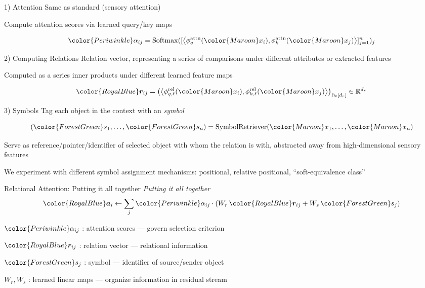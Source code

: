 \documentclass[xcolor={dvipsnames}]{beamer}
\newcommand{\senscolor}[1]{{\color{Maroon} #1 }}
\newcommand{\relcolor}[1]{{\color{RoyalBlue} #1 }}
\newcommand{\attncolor}[1]{{\color{Periwinkle} #1 }}
\newcommand{\symbcolor}[1]{{\color{ForestGreen} #1}}
\begin{document}
\begin{frame}{1) Attention}
    Same as standard (sensory attention)

    Compute attention scores via learned query/key maps

    \[\attncolor{\alpha_{ij}} = \mathrm{Softmax}([\iprod{\phiqattn(\senscolor{x_i})}{\phikattn(\senscolor{x_j})}]_{j=1}^{n})_j\]
\end{frame}

\begin{frame}{2) Computing Relations}
    \alert{Relation vector}, representing a series of comparisons under different attributes or extracted features

    Computed as a series inner products under different learned feature maps

    \[\relcolor{\bm{r}_{ij}} = \paren{\iprod{\phiqrell{\ell}(\senscolor{x_i})}{\phikrell{\ell}(\senscolor{x_j})}}_{\ell \in [d_r]} \in \reals^{d_r}\]
\end{frame}

\begin{frame}{3) Symbols}
    Tag each object in the context with an \symbcolor{\emph{symbol}}

    \[(\symbcolor{s_1}, \ldots, \symbcolor{s_n}) = \SymbolRetriever(\senscolor{x_1}, \ldots, \senscolor{x_n})\]

    Serve as reference/pointer/identifier of selected object with whom the relation is with, abstracted away from high-dimensional sensory features

    We experiment with different symbol assignment mechanisms: positional, relative positional, ``soft-equivalence class''
\end{frame}

\begin{frame}{Relational Attention: Putting it all together}
    \emph{Putting it all together}
    \begin{align*}
        \relcolor{\bm{a}_i} \gets \sum_{j} \attncolor{\alpha_{ij}} \cdot \paren{W_r \, \relcolor{\bm{r}_{ij}} + W_s \, \symbcolor{s_{j}}}
    \end{align*}

    $\attncolor{\alpha_{ij}}$ : attention scores --- govern selection criterion

    $\relcolor{\bm{r}_{ij}}$ : relation vector --- relational information

    $\symbcolor{s_{j}}$ : symbol --- identifier of source/sender object

    $W_r, W_s$ : learned linear maps --- organize information in residual stream
\end{frame}
\end{document}

